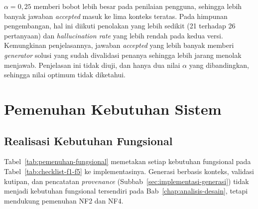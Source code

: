 $\alpha=0{,}25$ memberi bobot lebih besar pada penilaian pengguna, sehingga lebih banyak jawaban \emph{accepted} masuk ke lima konteks teratas. Pada himpunan pengembangan, hal ini diikuti penolakan yang lebih sedikit (21 terhadap 26 pertanyaan) dan \emph{hallucination rate} yang lebih rendah pada kedua versi. Kemungkinan penjelasannya, jawaban \emph{accepted} yang lebih banyak memberi \emph{generator} solusi yang sudah divalidasi penanya sehingga lebih jarang menolak menjawab. Penjelasan ini tidak diuji, dan hanya dua nilai $\alpha$ yang dibandingkan, sehingga nilai optimum tidak diketahui.

\section{Pemenuhan Kebutuhan Sistem}
\label{sec:pemenuhan-kebutuhan}

\subsection{Realisasi Kebutuhan Fungsional}
\label{subsec:realisasi-fungsional}

Tabel~\ref{tab:pemenuhan-fungsional} memetakan setiap kebutuhan fungsional pada Tabel~\ref{tab:checklist-f1-f5} ke implementasinya. Generasi berbasis konteks, validasi kutipan, dan pencatatan \emph{provenance} (Subbab~\ref{sec:implementasi-generasi}) tidak menjadi kebutuhan fungsional tersendiri pada Bab~\ref{chap:analisis-desain}, tetapi mendukung pemenuhan NF2 dan NF4.

